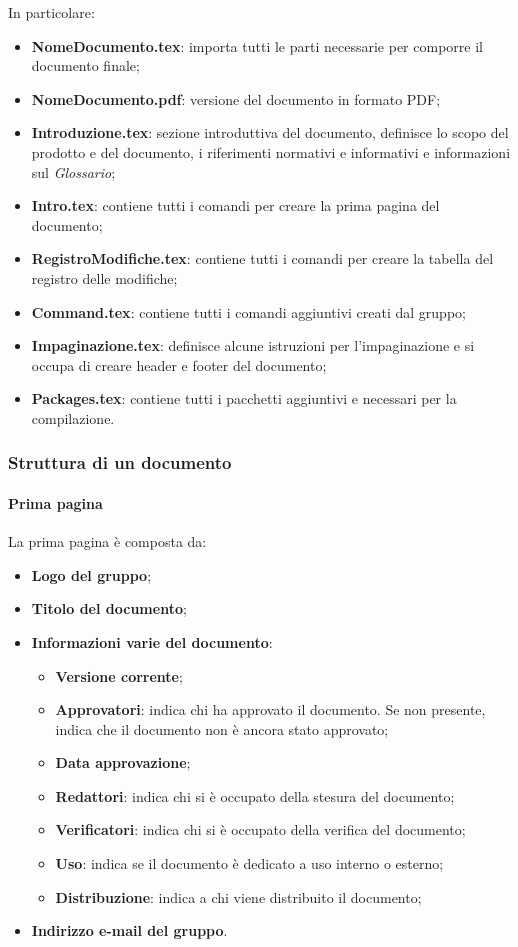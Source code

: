 In particolare:
\begin{itemize}
\item \textbf{NomeDocumento.tex}: importa tutti le parti necessarie per comporre il documento finale;
\item \textbf{NomeDocumento.pdf}: versione del documento in formato PDF;
\item \textbf{Introduzione.tex}:  sezione introduttiva del documento, definisce lo scopo del prodotto e del documento, i riferimenti normativi e informativi e informazioni sul \textit{Glossario};
\item \textbf{Intro.tex}: contiene tutti i comandi per creare la prima pagina del documento;
\item \textbf{RegistroModifiche.tex}: contiene tutti i comandi per creare la tabella del registro delle modifiche;
\item \textbf{Command.tex}: contiene tutti i comandi aggiuntivi creati dal gruppo;
\item \textbf{Impaginazione.tex}: definisce alcune istruzioni per l'impaginazione e si occupa di creare header e footer del documento;
\item \textbf{Packages.tex}: contiene tutti i pacchetti aggiuntivi e necessari per la compilazione.
\end{itemize}


\subsubsection{Struttura di un documento}
\paragraph{Prima pagina}
La prima pagina è composta da:
\begin{itemize}
  \item \textbf{Logo del gruppo};
  \item \textbf{Titolo del documento};
  \item \textbf{Informazioni varie del documento}:
      \begin{itemize}
      \item \textbf{Versione corrente};
      \item \textbf{Approvatori}: indica chi ha approvato il documento. Se non presente, indica che il documento non è ancora stato approvato;
      \item \textbf{Data approvazione};
      \item \textbf{Redattori}: indica chi si è occupato della stesura del documento;
      \item \textbf{Verificatori}: indica chi si è occupato della verifica del documento;
      \item \textbf{Uso}: indica se il documento è dedicato a uso interno o esterno;
      \item \textbf{Distribuzione}: indica a chi viene distribuito il documento;
        \end{itemize}
\item \textbf{Indirizzo e-mail del gruppo}.
\end{itemize}


